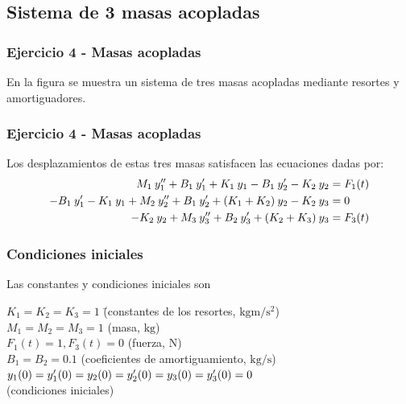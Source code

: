 \subsection{Sistema de 3 masas acopladas}
\begin{frame}[fragile]
\frametitle{Ejercicio 4 - Masas acopladas}
En la figura se muestra un sistema de tres masas acopladas mediante resortes y amortiguadores.
\begin{figure}
    \centering
    
\end{figure}
\end{frame}
\begin{frame}[fragile]
\frametitle{Ejercicio 4 - Masas acopladas}
Los desplazamientos de estas tres masas satisfacen las ecuaciones dadas por:
\fontsize{12}{12}\selectfont
\begin{align*} 
M_{1} \: {y}^{\prime \prime}_{1} + B_{1} \: {y}^{\prime}_{1} + K_{1} \: y_{1} - B_{1} \: {y}^{\prime}_{2} - K_{2} \: y_{2} &= F_{1}(t) \\
-B_{1} \: {y}^{\prime}_{1} - K_{1} \: y_{1} + M_{2} \:  {y}^{\prime \prime}_{2} + B_{1} \: {y}^{\prime}_{2} + (K_{1} + K_{2}) \: y_{2} - K_{2} \: y_{3} &= 0 \\
- K_{2} \: y_{2} + M_{3} \: {y}^{\prime \prime}_{3} + B_{2} \: {y}^{\prime}_{3} + (K_{2} + K_{3})  \: y_{3} &=  F_{3}(t) 
\end{align*}
\begin{figure}[h!]
    \centering
    
\end{figure}
\end{frame}
\begin{frame}
\frametitle{Condiciones iniciales}
Las constantes y condiciones iniciales son
\fontsize{12}{12}\selectfont
\begin{tabbing}
$K_{1} = K_{2} = K_{3} = 1$ \hspace{1.2cm} \= (constantes de los resortes, $\si{\kilo\gram\meter\per\square\second}$) \\
$M_{1} = M_{2} = M_{3} = 1$ \> (masa, $\si{\kilo\gram}$) \\
$F_{1}(t) = 1, F_{3}(t) = 0$ \> (fuerza, $\si{\newton}$) \\
$B_{1} = B_{2} = 0.1$ \> (coeficientes de amortiguamiento, $\si{\kilo\gram\per\second}$) \\
$y_{1}(0) = {y}^{\prime}_{1}(0) = y_{2}(0) = {y}^{\prime}_{2}(0) = y_{3}(0) = {y}^{\prime}_{3}(0) = 0$ \\
\> (condiciones iniciales)
\end{tabbing}
\end{frame}
